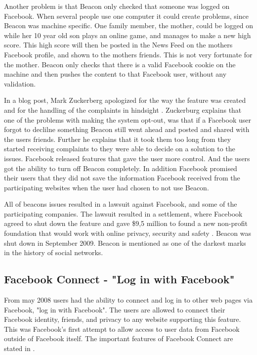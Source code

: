 Another problem is that Beacon only checked that someone was logged on Facebook. When several people use one computer it could create problems, since Beacon was machine specific. One family member, the mother, could be logged on while her 10 year old son plays an online game, and manages to make a new high score. This high score will then be posted in the News Feed on the mothers Facebook profile, and shown to the mothers friends. This is not very fortunate for the mother. Beacon only checks that there is a valid Facebook cookie on the machine and then pushes the content to that Facebook user, without any validation. 

In a blog post, Mark Zuckerberg apologized for the way the feature was created and for the handling of the complaints in hindsight \cite{Beacon}. Zuckerburg explains that one of the problems with making the system opt-out, was that if a Facebook user forgot to declilne something Beacon still went ahead and posted and shared with the users friends. Further he explains that it took them too long from they started receiving complaints to they were able to decide on a solution to the issues. Facebook released features that gave the user more control. And the users got the ability to turn off Beacon completely.  In addition Facebook promised their users that they did not save the information Facebook received from the participating websites when the user had chosen to not use Beacon. 

All of beacons issues resulted in a lawsuit against Facebook, and some of the participating companies. The lawsuit resulted in a settlement, where Facebook agreed to shut down the feature and gave \$9,5 million to found a new non-profit foundation that would work with online privacy, security and safety \cite{lawsuitB}. Beacon was shut down in September 2009. Beacon is mentioned as one of the darkest marks in the history of social networks.

\subsection{Facebook Connect - "Log in with Facebook"}
From may 2008 users had the ability to connect and log in to other web pages via Facebook, "log in with Facebook". The users are allowed to connect their Facebook identity, friends, and privacy to any website supporting this feature. This was Facebook's first attempt to allow access to user data from Facebook outside of Facebook itself. The important features of Facebook Connect are stated in .

